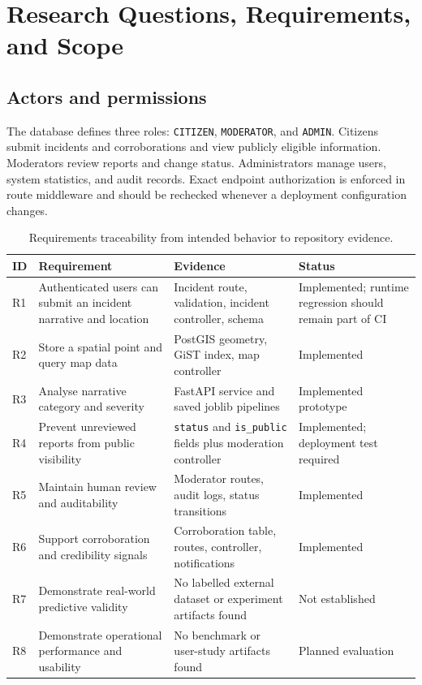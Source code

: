 \documentclass[11pt]{article}
\begin{document}
\section{Research Questions, Requirements, and Scope}
\label{sec:requirements}

\subsection{Actors and permissions}

The database defines three roles: \texttt{CITIZEN}, \texttt{MODERATOR}, and
\texttt{ADMIN}. Citizens submit incidents and corroborations and view
publicly eligible information. Moderators review reports and change status.
Administrators manage users, system statistics, and audit records. Exact
endpoint authorization is enforced in route middleware and should be
rechecked whenever a deployment configuration changes.

\begin{table}[H]
\centering
\caption{Requirements traceability from intended behavior to repository evidence.}
\label{tab:req}
\small
\begin{tabularx}{\textwidth}{p{}p{}p{}X}
\toprule
\textbf{ID} & \textbf{Requirement} & \textbf{Evidence} & \textbf{Status}\\
\midrule
R1 & Authenticated users can submit an incident narrative and location & Incident route, validation, incident controller, schema & Implemented; runtime regression should remain part of CI\\
R2 & Store a spatial point and query map data & PostGIS geometry, GiST index, map controller & Implemented\\
R3 & Analyse narrative category and severity & FastAPI service and saved joblib pipelines & Implemented prototype\\
R4 & Prevent unreviewed reports from public visibility & \texttt{status} and \texttt{is\_public} fields plus moderation controller & Implemented; deployment test required\\
R5 & Maintain human review and auditability & Moderator routes, audit logs, status transitions & Implemented\\
R6 & Support corroboration and credibility signals & Corroboration table, routes, controller, notifications & Implemented\\
R7 & Demonstrate real-world predictive validity & No labelled external dataset or experiment artifacts found & Not established\\
R8 & Demonstrate operational performance and usability & No benchmark or user-study artifacts found & Planned evaluation\\
\bottomrule
\end{tabularx}
\end{table}
\end{document}
